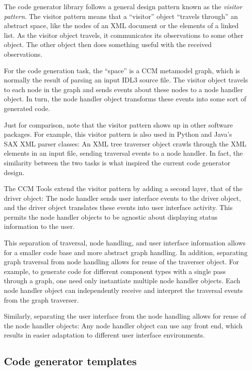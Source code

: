 The code generator library follows a general design pattern known as the {\it
visitor pattern\/}. The visitor pattern means that a ``visitor'' object
``travels through'' an abstract space, like the nodes of an XML document or the
elements of a linked list. As the visitor object travels, it communicates its
observations to some other object. The other object then does something useful
with the received observations.

For the code generation task, the ``space'' is a CCM metamodel graph, which is
normally the result of parsing an input IDL3 source file. The visitor object
travels to each node in the graph and sends events about these nodes to a node
handler object. In turn, the node handler object transforms these events into
some sort of generated code.

Just for comparison, note that the visitor pattern shows up in other software
packages. For example, this visitor pattern is also used in Python and Java's
SAX XML parser classes: An XML tree traverser object crawls through the XML
elements in an input file, sending traversal events to a node handler. In fact,
the similarity between the two tasks is what inspired the current code generator
design.

The CCM Tools extend the visitor pattern by adding a second layer, that of the
driver object: The node handler sends user interface events to the driver
object, and the driver object translates these events into user interface
activity. This permits the node handler objects to be agnostic about displaying
status information to the user.

This separation of traversal, node handling, and user interface information
allows for a smaller code base and more abstract graph handling. In addition,
separating graph traversal from node handling allows for reuse of the traverser
object. For example, to generate code for different component types with a
single pass through a graph, one need only instantiate multiple node handler
objects. Each node handler object can independently receive and interpret the
traversal events from the graph traverser.

Similarly, separating the user interface from the node handling allows for reuse
of the node handler objects: Any node handler object can use any front end,
which results in easier adaptation to different user interface environments.

\subsection{Code generator templates}


